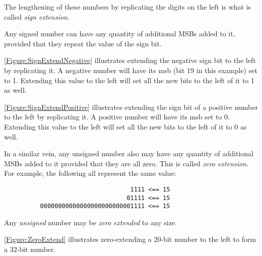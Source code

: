 The lengthening of these numbers by replicating the digits on the left
is what is called {\em sign extension}.  

\begin{tcolorbox}
Any signed number can have any quantity of additional MSBs added to it,
provided that they repeat the value of the sign bit.
\end{tcolorbox}

\autoref{Figure:SignExtendNegative} illustrates extending the negative sign
bit to the left by replicating it.
A negative number will have its \acrshort{msb} (bit 19 in this example)
set to 1.   Extending this value to the left will set all the new bits
to the left of it to 1 as well.

\begin{figure}[ht]
\centering
{}
\label{Figure:SignExtendNegative}
\end{figure}

\autoref{Figure:SignExtendPositive} illustrates extending the sign bit of a
positive number to the left by replicating it.
A positive number will have its \acrshort{msb} set to 0.  Extending this
value to the left will set all the new bits to the left of it to 0 as well.

\begin{figure}[ht]
\centering
{}
\label{Figure:SignExtendPositive}
\end{figure}


\label{ZeroExtension}
In a similar vein, any unsigned number also may have any quantity of 
additional MSBs added to it provided that they are all zero.  This is
called {\em zero extension}.  For example,
the following all represent the same value:
\begin{verbatim}
                                   1111 <== 15
                                  01111 <== 15
          00000000000000000000000001111 <== 15
\end{verbatim}

\begin{tcolorbox}
Any {\em unsigned} number may be {\em zero extended} to any size.
\end{tcolorbox}

%
\autoref{Figure:ZeroExtend} illustrates zero-extending a 20-bit number to the
left to form a 32-bit number.

